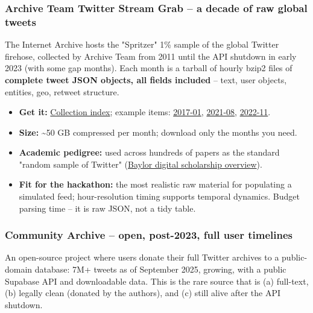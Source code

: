 \documentclass[twocolumn,10pt,letterpaper]{article}
\begin{document}
\subsubsection{Archive Team Twitter Stream Grab -- a decade of raw global tweets}

The Internet Archive hosts the "Spritzer" 1\% sample of the global Twitter firehose, collected by Archive Team from 2011 until the API shutdown in early 2023 (with some gap months). Each month is a tarball of hourly bzip2 files of \textbf{complete tweet JSON objects, all fields included} -- text, user objects, entities, geo, retweet structure.


\begin{itemize}
\setlength{\itemsep}{0pt}
\setlength{\parskip}{0pt}
  \item \textbf{Get it:} \href{https://archive.org/details/twitterstream}{Collection index}; example items: \href{https://archive.org/details/archiveteam-twitter-stream-2017-01}{2017-01}, \href{https://archive.org/details/archiveteam-twitter-stream-2021-08}{2021-08}, \href{https://archive.org/details/archiveteam-twitter-stream-2022-11}{2022-11}.
  \item \textbf{Size:} \textasciitilde{}50 GB compressed per month; download only the months you need.
  \item \textbf{Academic pedigree:} used across hundreds of papers as the standard "random sample of Twitter" (\href{https://blogs.baylor.edu/digitalscholarship/2018/11/02/archive-team-the-twitter-stream-grab-historic-twitter-content/}{Baylor digital scholarship overview}).
  \item \textbf{Fit for the hackathon:} the most realistic raw material for populating a simulated feed; hour-resolution timing supports temporal dynamics. Budget parsing time -- it is raw JSON, not a tidy table.
\end{itemize}

\subsubsection{Community Archive -- open, post-2023, full user timelines}

An open-source project where users donate their full Twitter archives to a public-domain database: 7M+ tweets as of September 2025, growing, with a public Supabase API and downloadable data. This is the rare source that is (a) full-text, (b) legally clean (donated by the authors), and (c) still alive after the API shutdown.
\end{document}
